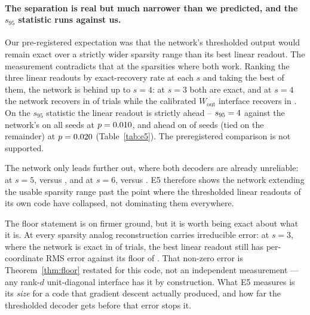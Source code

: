 \documentclass[preprint,12pt]{elsarticle}
\theoremstyle{definition}
\begin{document}
\paragraph{The separation is real but much narrower than we predicted, and the $s_{95}$
statistic runs against us.} Our pre-registered expectation was that the network's thresholded
output would remain exact over a strictly wider sparsity range than its best linear readout.
The measurement contradicts that at the sparsities where both work. Ranking the three linear
readouts by exact-recovery rate at each $s$ and taking the best of them, the network is behind
up to $s=4$: at $s=3$ both are exact, and at $s=4$ the network recovers in
\EfiveLfourPmodelFour{} of trials while the calibrated $W_{\mathrm{out}}$ interface recovers in
\EfiveLfourPlinFour. On the $s_{95}$ statistic the linear readout is strictly ahead --
$s_{95}=4$ against the network's \EfiveLfourSmodelMax{} on all
\EfiveSeeds{} seeds at $p=0.010$, and ahead on
\EfiveLfourSlinAheadSecondary{} of \EfiveSeeds{} seeds (tied on the remainder) at
$p=0.020$ (Table~\ref{tab:e5}). The preregistered comparison is not supported.

The network only leads further out, where both decoders are already unreliable: at $s=5$,
\EfiveLfourPmodelFive{} versus \EfiveLfourPlinFive, and at $s=6$, \EfiveLfourPmodelSix{} versus
\EfiveLfourPlinSix. E5 therefore shows the network extending the usable sparsity range past the point where the
thresholded linear readouts of its own code have collapsed, not dominating them everywhere.

The floor statement is on firmer ground, but it is worth being exact about what it is. At every
sparsity analog reconstruction carries irreducible error: at $s=3$, where the network is exact in
\EfiveLfourPmodelThree{} of trials, the best linear readout still has per-coordinate RMS error
\EfiveLfourRmsThree{} against its floor of \EfiveLfourFloorThree. That non-zero error is
Theorem~\ref{thm:floor} restated for this code, not an independent measurement --- any
rank-$d$ unit-diagonal interface has it by construction. What E5 measures is its \emph{size} for
a code that gradient descent actually produced, and how far the thresholded decoder gets before
that error stops it.
\end{document}
